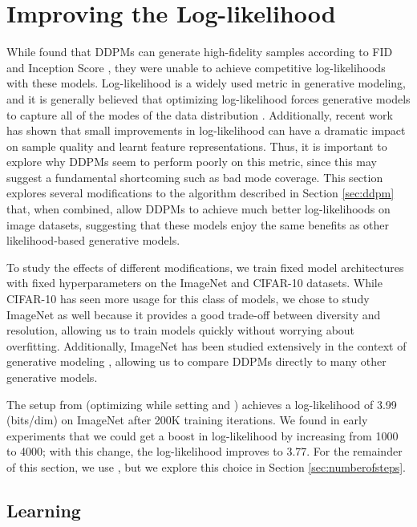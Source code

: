 \documentclass{article}
\begin{document}
\section{Improving the Log-likelihood}
\label{sec:improvinglikelihood}

While \citet{ddpm} found that DDPMs can generate high-fidelity samples according to FID \citep{fid} and Inception Score \citep{inceptionscore}, they were unable to achieve competitive log-likelihoods with these models. Log-likelihood is a widely used metric in generative modeling, and it is generally believed that optimizing log-likelihood forces generative models to capture all of the modes of the data distribution \citep{vqvae2}. Additionally, recent work \citep{scalingcompendium} has shown that small improvements in log-likelihood can have a dramatic impact on sample quality and learnt feature representations. Thus, it is important to explore why DDPMs seem to perform poorly on this metric, since this may suggest a fundamental shortcoming such as bad mode coverage. This section explores several modifications to the algorithm described in Section \ref{sec:ddpm} that, when combined, allow DDPMs to achieve much better log-likelihoods on image datasets, suggesting that these models enjoy the same benefits as other likelihood-based generative models.

To study the effects of different modifications, we train fixed model architectures with fixed hyperparameters on the ImageNet  \citep{imagenet64} and CIFAR-10 \citep{cifar10} datasets. While CIFAR-10 has seen more usage for this class of models, we chose to study ImageNet  as well because it provides a good trade-off between diversity and resolution, allowing us to train models quickly without worrying about overfitting. Additionally, ImageNet  has been studied extensively in the context of generative modeling \citep{pixelcnn,spn,sparsetransformer,routingtransformer}, allowing us to compare DDPMs directly to many other generative models.

The setup from \citet{ddpm} (optimizing  while setting  and ) achieves a log-likelihood of 3.99 (bits/dim) on ImageNet  after 200K training iterations. We found in early experiments that we could get a boost in log-likelihood by increasing  from 1000 to 4000; with this change, the log-likelihood improves to 3.77. For the remainder of this section, we use , but we explore this choice in Section \ref{sec:numberofsteps}.

\subsection{Learning }
\label{sec:learnsigma}
\end{document}
